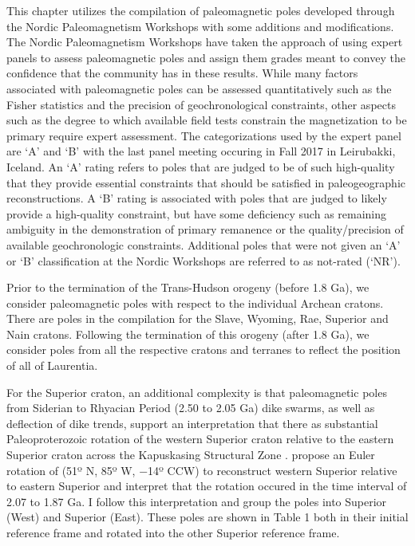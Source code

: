 \documentclass[11pt,letterpaper]{article}
\begin{document}
This chapter utilizes the compilation of paleomagnetic poles developed through the Nordic Paleomagnetism Workshops with some additions and modifications. The Nordic Paleomagnetism Workshops have taken the approach of using expert panels to assess paleomagnetic poles and assign them grades meant to convey the confidence that the community has in these results. While many factors associated with paleomagnetic poles can be assessed quantitatively such as the Fisher statistics and the precision of geochronological constraints, other aspects such as the degree to which available field tests constrain the magnetization to be primary require expert assessment. The categorizations used by the expert panel are `A' and `B' with the last panel meeting occuring in Fall 2017 in Leirubakki, Iceland. An `A' rating refers to poles that are judged to be of such high-quality that they provide essential constraints that should be satisfied in paleogeographic reconstructions. A `B' rating is associated with poles that are judged to likely provide a high-quality constraint, but have some deficiency such as remaining ambiguity in the demonstration of primary remanence or the quality/precision of available geochronologic constraints. Additional poles that were not given an `A' or `B' classification at the Nordic Workshops are referred to as not-rated (`NR').

Prior to the termination of the Trans-Hudson orogeny (before 1.8 Ga), we consider paleomagnetic poles with respect to the individual Archean cratons. There are poles in the compilation for the Slave, Wyoming, Rae, Superior and Nain cratons. Following the termination of this orogeny (after 1.8 Ga), we consider poles from all the respective cratons and terranes to reflect the position of all of Laurentia.

For the Superior craton, an additional complexity is that paleomagnetic poles from Siderian to Rhyacian Period (2.50 to 2.05 Ga) dike swarms, as well as deflection of dike trends, support an interpretation that there as substantial Paleoproterozoic rotation of the western Superior craton relative to the eastern Superior craton across the Kapuskasing Structural Zone \citep{Bates1991a, Evans2010a}. \cite{Evans2010a} propose an Euler rotation of (51º N, 85º W, −14º CCW) to reconstruct western Superior relative to eastern Superior and interpret that the rotation occured in the time interval of 2.07 to 1.87 Ga. I follow this interpretation and group the poles into Superior (West) and Superior (East). These poles are shown in Table 1 both in their initial reference frame and rotated into the other Superior reference frame.
\end{document}
